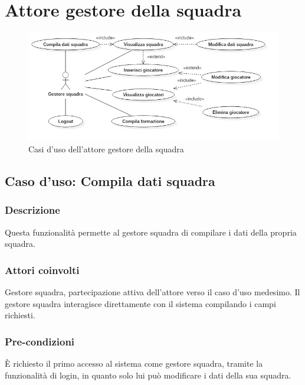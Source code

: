 
\clearpage

\section{Attore gestore della squadra}
%
%
\begin{figure}[h]
	\centering
	\includegraphics[width=1\textwidth]
	{immagini/uc-gestore-squadra}
	
	\caption{Casi d'uso dell'attore gestore della squadra}
\end{figure}


%
%
\subsection{Caso d'uso: Compila dati squadra}
\label{uc-compila-squadra}

\subsubsection*{Descrizione}
Questa funzionalità permette al gestore squadra di compilare i dati della propria squadra.

\subsubsection*{Attori coinvolti}
Gestore squadra, partecipazione attiva dell'attore verso il caso d'uso medesimo.
Il gestore squadra interagisce direttamente con il sistema compilando i campi richiesti.

\subsubsection*{Pre-condizioni}
È richiesto il primo accesso al sistema come gestore squadra, tramite la funzionalità di login, in quanto solo lui può modificare i dati della sua squadra.

